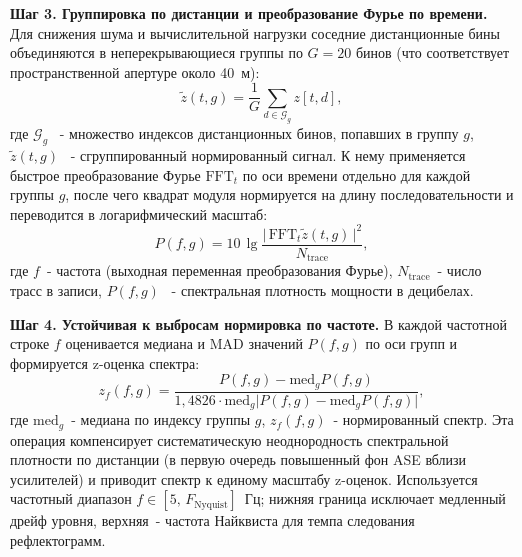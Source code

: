 \documentclass[12pt,a4paper]{extarticle}
\begin{document}
\textbf{Шаг 3. Группировка по дистанции и преобразование Фурье по времени.} Для снижения шума и вычислительной нагрузки соседние дистанционные бины объединяются в неперекрывающиеся группы по $G = 20$ бинов (что соответствует пространственной апертуре около 40~м):
\begin{equation}
  \tilde{z}(t, g) = \frac{1}{G}\sum_{d \in \mathcal{G}_g} z[t, d],
\end{equation}
где $\mathcal{G}_g$~ - множество индексов дистанционных бинов, попавших в группу $g$, $\tilde{z}(t, g)$~ - сгруппированный нормированный сигнал. К нему применяется быстрое преобразование Фурье $\mathrm{FFT}_t$ по оси времени отдельно для каждой группы $g$, после чего квадрат модуля нормируется на длину последовательности и переводится в логарифмический масштаб:
\begin{equation}
  P(f, g) = 10\,\lg \frac{\big|\,\mathrm{FFT}_t \tilde{z}(t, g)\,\big|^2}{N_\text{trace}},
\end{equation}
где $f$~- частота (выходная переменная преобразования Фурье), $N_\text{trace}$~- число трасс в записи, $P(f, g)$~ - спектральная плотность мощности в децибелах.

\textbf{Шаг 4. Устойчивая к выбросам нормировка по частоте.} В каждой частотной строке $f$ оценивается медиана и MAD значений $P(f, g)$ по оси групп и формируется z-оценка спектра:
\begin{equation}
  z_f(f, g) = \frac{P(f, g) - \mathrm{med}_g P(f, g)}{1{,}4826 \cdot \mathrm{med}_g \big|P(f, g) - \mathrm{med}_g P(f, g)\big|},
\end{equation}
где $\mathrm{med}_g$~- медиана по индексу группы $g$, $z_f(f, g)$~- нормированный спектр. Эта операция компенсирует систематическую неоднородность спектральной плотности по дистанции (в первую очередь повышенный фон ASE вблизи усилителей) и приводит спектр к единому масштабу z-оценок. Используется частотный диапазон $f \in [5,\,F_\text{Nyquist}]$~Гц; нижняя граница исключает медленный дрейф уровня, верхняя~- частота Найквиста для темпа следования рефлектограмм.
\end{document}
